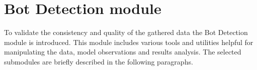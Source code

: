 \section{Bot Detection module}\label{sec:bot-detection-module}
To validate the consistency and quality of the gathered data the Bot Detection module is introduced.
This module includes various tools and utilities helpful for manipulating the data, model observations and results analysis.
The selected submodules are briefly described in the following paragraphs.
